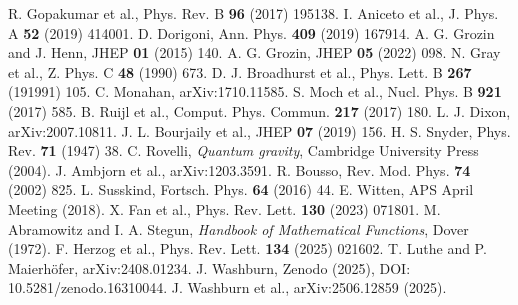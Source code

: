 \documentclass[11pt,a4paper]{article}
\theoremstyle{definition}
\theoremstyle{remark}
\begin{document}
\begin{thebibliography}{99}
 R. Gopakumar et al., Phys. Rev. B \textbf{96} (2017) 195138.
 I. Aniceto et al., J. Phys. A \textbf{52} (2019) 414001.
 D. Dorigoni, Ann. Phys. \textbf{409} (2019) 167914.
 A. G. Grozin and J. Henn, JHEP \textbf{01} (2015) 140.
 A. G. Grozin, JHEP \textbf{05} (2022) 098.
 N. Gray et al., Z. Phys. C \textbf{48} (1990) 673.
 D. J. Broadhurst et al., Phys. Lett. B \textbf{267} (191991) 105.
 C. Monahan, arXiv:1710.11585.
 S. Moch et al., Nucl. Phys. B \textbf{921} (2017) 585.
 B. Ruijl et al., Comput. Phys. Commun. \textbf{217} (2017) 180.
 L. J. Dixon, arXiv:2007.10811.
 J. L. Bourjaily et al., JHEP \textbf{07} (2019) 156.
 H. S. Snyder, Phys. Rev. \textbf{71} (1947) 38.
 C. Rovelli, \emph{Quantum gravity}, Cambridge University Press (2004).
 J. Ambjorn et al., arXiv:1203.3591.
 R. Bousso, Rev. Mod. Phys. \textbf{74} (2002) 825.
 L. Susskind, Fortsch. Phys. \textbf{64} (2016) 44.
 E. Witten, APS April Meeting (2018).
 X. Fan et al., Phys. Rev. Lett. \textbf{130} (2023) 071801.
 M. Abramowitz and I. A. Stegun, \emph{Handbook of Mathematical Functions}, Dover (1972).
 F. Herzog et al., Phys. Rev. Lett. \textbf{134} (2025) 021602.
 T. Luthe and P. Maierhöfer, arXiv:2408.01234.
 J. Washburn, Zenodo (2025), DOI: 10.5281/zenodo.16310044.
 J. Washburn et al., arXiv:2506.12859 (2025).

\end{thebibliography}
\end{document}

